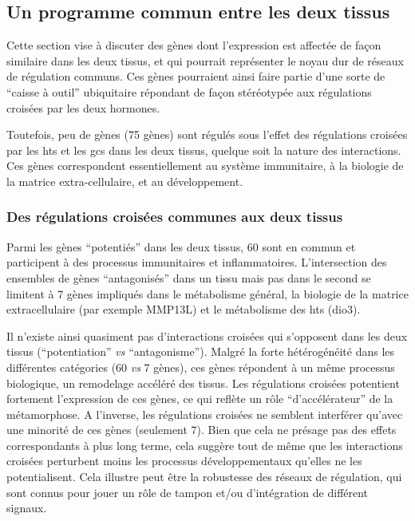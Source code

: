 \documentclass[../main.tex]{subfiles}
\begin{document}
	\subsection{Un programme commun entre les deux tissus}
		Cette section vise à discuter des gènes dont l'expression est affectée de façon similaire dans les deux tissus, et qui pourrait représenter le noyau dur de réseaux de régulation communs.
		Ces gènes pourraient ainsi faire partie d'une sorte de ``caisse à outil'' ubiquitaire répondant de façon stéréotypée aux régulations croisées par les deux hormones.
		\par
		Toutefois, peu de gènes (75 gènes) sont régulés sous l'effet des régulations croisées par les \glspl{ht} et les \glspl{gc} dans les deux tissus, quelque soit la nature des interactions.
		Ces gènes correspondent essentiellement au système immunitaire, à la biologie de la matrice extra-cellulaire, et au développement.

		\subsubsection{Des régulations croisées communes aux deux tissus}
			Parmi les gènes ``potentiés'' dans les deux tissus, 60 sont en commun et participent à des processus immunitaires et inflammatoires.
			L'intersection des ensembles de gènes ``antagonisés'' dans un tissu mais pas dans le second se limitent à 7 gènes impliqués dans le métabolisme général, la biologie de la matrice extracellulaire (par exemple MMP13L) et le métabolisme des \glspl{ht} (\gls{dio3}).
			\par
			Il n'existe ainsi quasiment pas d'interactions croisées qui s'opposent dans les deux tissus (``potentiation'' \textit{vs} ``antagonisme'').
			Malgré la forte hétérogénéité dans les différentes catégories (60 \textit{vs} 7 gènes), ces gènes répondent à un même processus biologique, un remodelage accéléré des tissus.
			Les régulations croisées potentient fortement l'expression de ces gènes, ce qui reflète un rôle ``d'accélérateur'' de la métamorphose.
			A l'inverse, les régulations croisées ne semblent interférer qu'avec une minorité de ces gènes (seulement 7).
			Bien que cela ne présage pas des effets correspondants à plus long terme, cela suggère tout de même que les interactions croisées perturbent moins les processus développementaux qu'elles ne les potentialisent.
			Cela illustre peut être la robustesse des réseaux de régulation, qui sont connus pour jouer un rôle de tampon et/ou d'intégration de différent signaux.
\end{document}
